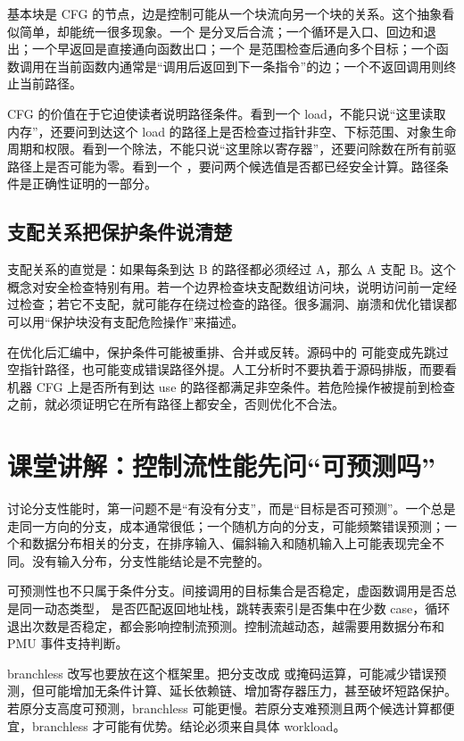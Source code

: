 基本块是 CFG 的节点，边是控制可能从一个块流向另一个块的关系。这个抽象看似简单，却能统一很多现象。一个  是分叉后合流；一个循环是入口、回边和退出；一个早返回是直接通向函数出口；一个  是范围检查后通向多个目标；一个函数调用在当前函数内通常是“调用后返回到下一条指令”的边；一个不返回调用则终止当前路径。

CFG 的价值在于它迫使读者说明路径条件。看到一个 load，不能只说“这里读取内存”，还要问到达这个 load 的路径上是否检查过指针非空、下标范围、对象生命周期和权限。看到一个除法，不能只说“这里除以寄存器”，还要问除数在所有前驱路径上是否可能为零。看到一个 ，要问两个候选值是否都已经安全计算。路径条件是正确性证明的一部分。

\subsection{支配关系把保护条件说清楚}

支配关系的直觉是：如果每条到达 B 的路径都必须经过 A，那么 A 支配 B。这个概念对安全检查特别有用。若一个边界检查块支配数组访问块，说明访问前一定经过检查；若它不支配，就可能存在绕过检查的路径。很多漏洞、崩溃和优化错误都可以用“保护块没有支配危险操作”来描述。

在优化后汇编中，保护条件可能被重排、合并或反转。源码中的  可能变成先跳过空指针路径，也可能变成错误路径外提。人工分析时不要执着于源码排版，而要看机器 CFG 上是否所有到达 use 的路径都满足非空条件。若危险操作被提前到检查之前，就必须证明它在所有路径上都安全，否则优化不合法。

\section{课堂讲解：控制流性能先问“可预测吗”}

讨论分支性能时，第一问题不是“有没有分支”，而是“目标是否可预测”。一个总是走同一方向的分支，成本通常很低；一个随机方向的分支，可能频繁错误预测；一个和数据分布相关的分支，在排序输入、偏斜输入和随机输入上可能表现完全不同。没有输入分布，分支性能结论是不完整的。

可预测性也不只属于条件分支。间接调用的目标集合是否稳定，虚函数调用是否总是同一动态类型， 是否匹配返回地址栈，跳转表索引是否集中在少数 case，循环退出次数是否稳定，都会影响控制流预测。控制流越动态，越需要用数据分布和 PMU 事件支持判断。

branchless 改写也要放在这个框架里。把分支改成  或掩码运算，可能减少错误预测，但可能增加无条件计算、延长依赖链、增加寄存器压力，甚至破坏短路保护。若原分支高度可预测，branchless 可能更慢。若原分支难预测且两个候选计算都便宜，branchless 才可能有优势。结论必须来自具体 workload。

